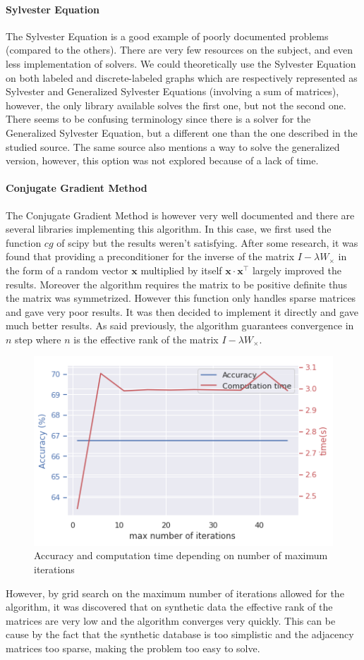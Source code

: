 \documentclass{article}
\let\vec\mathbf
\theoremstyle{definition}
\begin{document}
\paragraph{Sylvester Equation}
The Sylvester Equation is a good example of poorly documented problems (compared to the others). There are very few resources on the subject, and even less implementation of solvers. We could theoretically use the Sylvester Equation on both labeled and discrete-labeled graphs which are respectively represented as Sylvester and Generalized Sylvester Equations (involving a sum of matrices), however, the only library available solves the first one, but not the second one. There seems to be confusing terminology since there is a solver for the Generalized Sylvester Equation, but a different one than the one described in the studied source\cite{vishwanathan_graph_2010}. The same source also mentions a way to solve the generalized version\cite{lathauwer2004}, however, this option was not explored because of a lack of time.  
\paragraph{Conjugate Gradient Method}
The Conjugate Gradient Method is however very well documented\cite{nesterov_lectures_2018} and there are several libraries implementing this algorithm. In this case, we first used the function $cg$ of scipy\cite{jones2016scipy} but the results weren't satisfying. After some research, it was found that providing a preconditioner for the inverse of the matrix $I-\lambda W_\times$ in the form of a random vector $\vec{x}$ multiplied by itself $\vec{x} \cdot \vec{x}^{\top}$ largely improved the results. Moreover the algorithm requires the matrix to be positive definite thus the matrix was symmetrized. However this function only handles sparse matrices and gave very poor results. It was then decided to implement it directly and gave much better results. As said previously, the algorithm guarantees convergence in $n$ step where $n$ is the effective rank of the matrix $I-\lambda W_\times$. 
\begin{figure}[!htb]
	\centering
	\includegraphics[width=0.7\linewidth]{data/conj_grad/acc_time_fct_iter.png}
	\caption{Accuracy and computation time depending on number of maximum iterations}
\end{figure}
However, by grid search on the maximum number of iterations allowed for the algorithm, it was discovered that on synthetic data the effective rank of the matrices are very low and the algorithm converges very quickly. This can be cause by the fact that the synthetic database is too simplistic and the adjacency matrices too sparse, making the problem too easy to solve.
\end{document}

